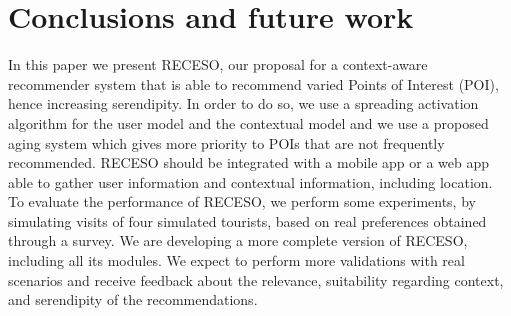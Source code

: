\vspace{-0.2cm}
\section{Conclusions and future work} \label{section:conclu}

In this paper we present RECESO, our proposal for a context-aware recommender system that is able to recommend varied Points of Interest (POI), hence increasing serendipity. In order to do so, we use a spreading activation algorithm for the user model and the contextual model and we use a proposed aging system which gives more priority to POIs that are not frequently recommended. RECESO should be integrated with a mobile app or a web app able to gather user information and contextual information, including location. To evaluate the performance of RECESO, we perform some experiments, by simulating visits of four simulated tourists, based on real preferences obtained through a survey. We are developing a more complete version of RECESO, including all its modules. We expect to perform more validations with real scenarios and receive feedback about the relevance, suitability regarding context, and serendipity of the recommendations.

